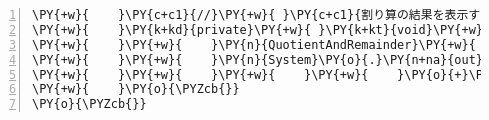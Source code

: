 \begin{Verbatim}[commandchars=\\\{\},numbers=left,firstnumber=1,stepnumber=1,frame=single,fontsize=\small]
\PY{+w}{    }\PY{c+c1}{//}\PY{+w}{ }\PY{c+c1}{割り算の結果を表示する}
\PY{+w}{    }\PY{k+kd}{private}\PY{+w}{ }\PY{k+kt}{void}\PY{+w}{ }\PY{n+nf}{output}\PY{o}{(}\PY{n}{Output}\PY{+w}{ }\PY{n}{output}\PY{o}{)}\PY{+w}{ }\PY{o}{\PYZob{}}
\PY{+w}{    }\PY{+w}{    }\PY{n}{QuotientAndRemainder}\PY{+w}{ }\PY{n}{qar}\PY{+w}{ }\PY{o}{=}\PY{+w}{ }\PY{o}{(}\PY{n}{QuotientAndRemainder}\PY{o}{)}\PY{+w}{ }\PY{n}{output}\PY{o}{;}
\PY{+w}{    }\PY{+w}{    }\PY{n}{System}\PY{o}{.}\PY{n+na}{out}\PY{o}{.}\PY{n+na}{print}\PY{o}{(}\PY{l+s}{"商は"}\PY{+w}{ }\PY{o}{+}\PY{+w}{ }\PY{n}{qar}\PY{o}{.}\PY{n+na}{quotient}
\PY{+w}{    }\PY{+w}{    }\PY{+w}{    }\PY{+w}{    }\PY{o}{+}\PY{+w}{ }\PY{l+s}{"で余は"}\PY{+w}{ }\PY{o}{+}\PY{+w}{ }\PY{n}{qar}\PY{o}{.}\PY{n+na}{remainder}\PY{+w}{ }\PY{o}{+}\PY{+w}{ }\PY{l+s}{"です"}\PY{o}{)}\PY{o}{;}
\PY{+w}{    }\PY{o}{\PYZcb{}}
\PY{o}{\PYZcb{}}
\end{Verbatim}
